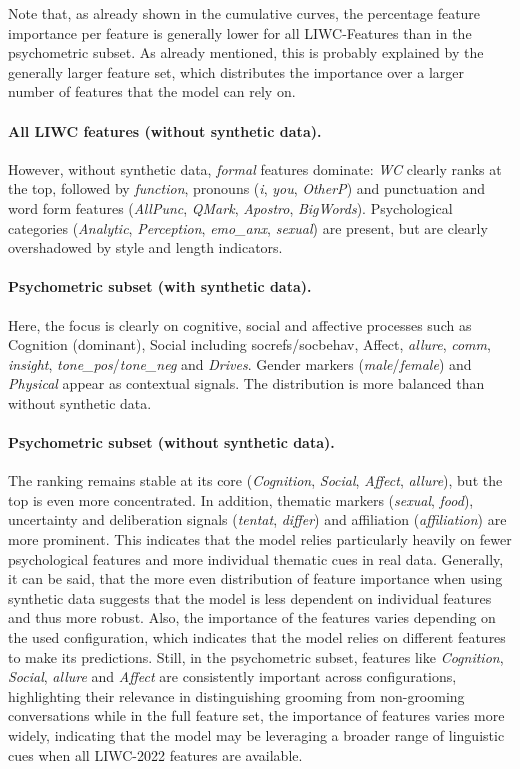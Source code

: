 Note that, as already shown in the cumulative curves, the percentage feature importance per feature is generally lower for all LIWC-Features than in the psychometric subset. As already mentioned, this is probably explained by the generally larger feature set, which distributes the importance over a larger number of features that the model can rely on.

\paragraph{All LIWC features (without synthetic data).}
However, without synthetic data, \emph{formal} features dominate: \textit{WC} clearly ranks at the top, followed by \textit{function}, pronouns (\textit{i}, \textit{you}, \textit{OtherP}) and punctuation and word form features (\textit{AllPunc}, \textit{QMark}, \textit{Apostro}, \textit{BigWords}). Psychological categories (\textit{Analytic}, \textit{Perception}, \textit{emo\_anx}, \textit{sexual}) are present, but are clearly overshadowed by style and length indicators.
 

\paragraph{Psychometric subset (with synthetic data).}
Here, the focus is clearly on cognitive, social and affective processes such as Cognition (dominant), Social including socrefs/socbehav, Affect, \textit{allure}, \textit{comm}, \textit{insight}, \textit{tone\_pos}/\textit{tone\_neg} and \textit{Drives}. Gender markers (\textit{male}/\textit{female}) and \textit{Physical} appear as contextual signals. The distribution is more balanced than without synthetic data.


\paragraph{Psychometric subset (without synthetic data).}
The ranking remains stable at its core (\textit{Cognition}, \textit{Social}, \textit{Affect}, \textit{allure}), but the top is even more concentrated. In addition, thematic markers (\textit{sexual}, \textit{food}), uncertainty and deliberation signals (\textit{tentat}, \textit{differ}) and affiliation (\textit{affiliation}) are more prominent. This indicates that the model relies particularly heavily on fewer psychological features and more individual thematic cues in real data. Generally, it can be said, that the more even distribution of feature importance when using synthetic data suggests that the model is less dependent on individual features and thus more robust. Also, the importance of the features varies depending on the used configuration, which indicates that the model relies on different features to make its predictions. Still, in the psychometric subset, features like \textit{Cognition}, \textit{Social}, \textit{allure} and \textit{Affect} are consistently important across configurations, highlighting their relevance in distinguishing grooming from non-grooming conversations while in the full feature set, the importance of features varies more widely, indicating that the model may be leveraging a broader range of linguistic cues when all LIWC-2022 features are available.


